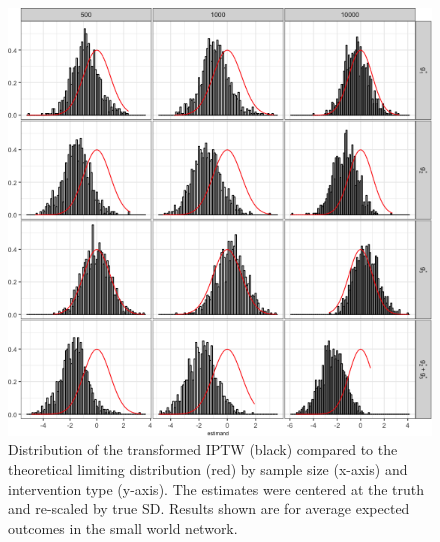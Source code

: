 \documentclass[english]{article}\usepackage[]{graphicx}\usepackage[]{color}
\makeatletter
\def\maxwidth{ %
  \ifdim\Gin@nat@width>\linewidth
    \linewidth
  \else
    \Gin@nat@width
  \fi
}
\newenvironment{knitrout}{}{} %
\theoremstyle{plain}
\theoremstyle{plain}
\makeatother
\begin{document}
\begin{knitrout}\footnotesize
{}\color{fgcolor}\begin{figure}

{\centering \includegraphics[width=\maxwidth]{TablesFigs/knitR-hist_IPTW_EY_smwld-1} 

}

\caption[Distribution of the transformed IPTW (black) compared to the theoretical limiting distribution (red) by sample size (x-axis) and intervention type (y-axis)]{Distribution of the transformed IPTW (black) compared to the theoretical limiting distribution (red) by sample size (x-axis) and intervention type (y-axis). The estimates were centered at the truth and re-scaled by true SD. Results shown are for average expected outcomes in the small world network.}\label{fig:hist.IPTW.EY.smwld}
\end{figure}


\end{knitrout}
\end{document}
